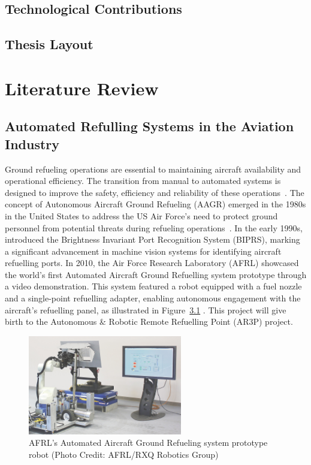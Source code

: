 \documentclass[12pt,oneside]{book} %
\begin{document}
\section{Technological Contributions}

\section{Thesis Layout}


\chapter{Literature Review}
\section{Automated Refulling Systems in the Aviation Industry}
Ground refueling operations are essential to maintaining aircraft availability
and operational efficiency. The transition from manual to automated systems is
designed to improve the safety, efficiency and reliability of these
operations~\cite{ExpertSystemsAGR}. The concept of Autonomous Aircraft Ground
Refueling (AAGR) emerged in the 1980s in the United States to address the US
Air Force’s need to protect ground personnel from potential threats during
refueling operations~\cite{Schultz1986}. In the early 1990s,
\citet{Bennett1991} introduced the Brightness Invariant Port Recognition System
(BIPRS), marking a significant advancement in machine vision systems for
identifying aircraft refuelling ports. In 2010, the Air Force Research
Laboratory (AFRL) showcased the world’s first Automated Aircraft Ground
Refuelling system prototype through a video demonstration. This system featured
a robot equipped with a fuel nozzle and a single-point refuelling adapter,
enabling autonomous engagement with the aircraft's refuelling panel, as
illustrated in Figure~\ref{fig:test-2010} \cite{Burnette2010}. This project
will give birth to the Autonomous \& Robotic Remote Refuelling Point (AR3P)
project.

\begin{figure}[H]
    \centering
    \includegraphics[width=0.6\textwidth]{figures/test_2010.jpeg}
    \caption{AFRL's Automated Aircraft Ground Refueling system prototype robot (Photo Credit: AFRL/RXQ Robotics Group)}\label{fig:test-2010}
    \label{fig:test-2010}
\end{figure}
\end{document}
